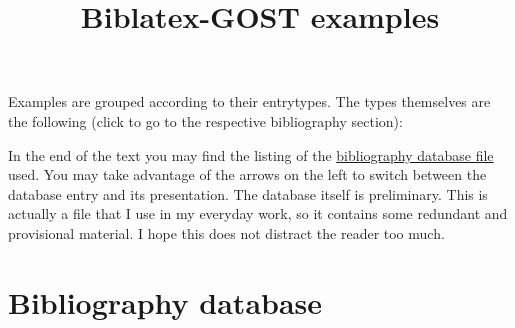 \documentclass[a4paper,10pt]{article}
\title{Biblatex-GOST examples}
\date{}
\begin{document}
\maketitle
Examples are grouped according to their entrytypes. The types themselves are the following 
(click to go to the respective bibliography section):
\renewcommand*{\do}[1]{\hyperref[#1]{@#1}\\}
\begin{multicols}{5}
\noindent%
\end{multicols}

In the end of the text you may find the listing of the 
\hyperref[bibfile]{bibliography database file} used. 
You may take advantage of 
the arrows on the left to switch between the database entry and its presentation.
The database itself is preliminary. This is actually a file that I use in my everyday work, 
so it contains some redundant and provisional material. I hope this does not distract
the reader too much.  

\nocite{*}

\renewcommand*{\do}[1]{\section{@#1\label{#1}}\printbibliography[type=#1]}

\section{Bibliography database\label{bibfile}}
{\small 

}
\end{document}
